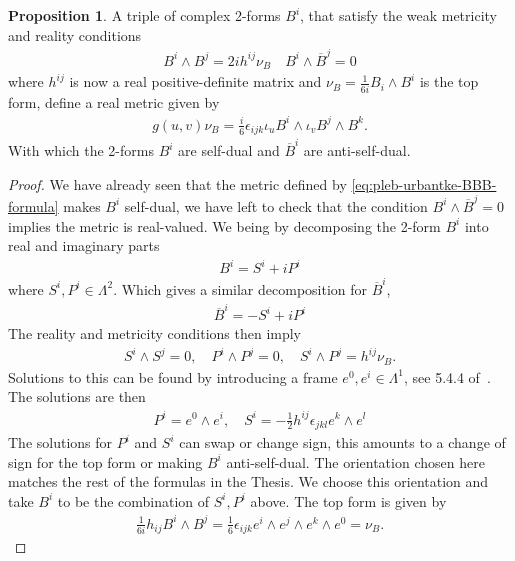 \documentclass[10pt]{report}
\theoremstyle{definition}
\newtheorem{proposition}{Proposition}[chapter]
\begin{document}
\begin{proposition}
    A triple of complex 2-forms $B^i$, that satisfy the weak metricity and reality conditions
    \begin{align}
        B^i \wedge B^j = 2i h^{ij} \nu_B \quad  B^i \wedge \overline{B}^j = 0
    \end{align} 
    where $h^{ij}$ is now a real positive-definite matrix and $\nu_B = \frac{1}{6i} B_i \wedge B^i$ is the top form, define a real metric given by
    \begin{align}
		g(u,v) \nu_B = \frac{i}{6} \epsilon_{ijk} \iota_u B^i \wedge \iota_v B^j \wedge B^k.
    \end{align}
    With which the 2-forms $B^i$ are self-dual and $\overline{B}^i$ are anti-self-dual.
\end{proposition}
\begin{proof}
    We have already seen that the metric defined by \cref{eq:pleb-urbantke-BBB-formula} makes $B^i$ self-dual, we have left to check that the condition $B^i \wedge \overline{B}^j = 0$ implies the metric is real-valued. We being by decomposing the 2-form $B^i$ into real and imaginary parts 
    \begin{align}
        B^i = S^i + i P^i
    \end{align}
    where $S^i,P^i \in \Lambda^2$. Which gives a similar decomposition for $\overline{B}^i$,
    \begin{align}
        \overline{B}^i = -S^i + i P^i
    \end{align}
    The reality and metricity conditions then imply
    \begin{align}
       S^i \wedge S^j = 0, \quad P^i \wedge P^j = 0, \quad S^i \wedge P^j = h^{ij} \nu_B.
    \end{align}
    Solutions to this can be found by introducing a frame $e^0,e^i \in \Lambda^1$, see 5.4.4 of~\cite{FormGenRelGravity2020}. The solutions are then 
    \begin{align}
        P^i = e^0 \wedge e^i, \quad S^i = -\frac{1}{2} h^{i j} \epsilon_{jkl} e^k \wedge e^l
    \end{align}
    The solutions for $P^i$ and $S^i$ can swap or change sign, this amounts to a change of sign for the top form or making $B^i$ anti-self-dual. The orientation chosen here matches the rest of the formulas in the Thesis.
    We choose this orientation and take $B^i$ to be the combination of $S^i, P^i$ above. The top form is given by 
    \begin{align}
        \frac{1}{6i} h_{ij} B^i \wedge B^j = \frac{1}{6} \epsilon_{ijk} e^{i} \wedge e^j \wedge e^k \wedge e^0 = \nu_B.

\end{align}
\end{proof}
\end{document}
